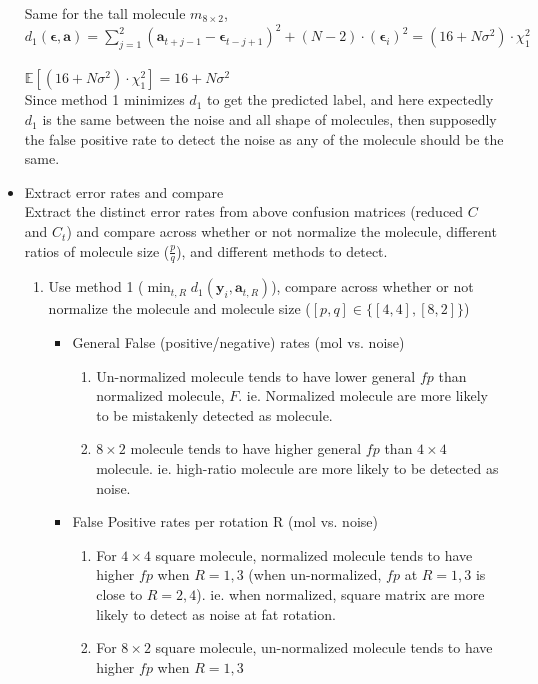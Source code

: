 \documentclass[11pt]{article}
\newcommand{\by}{\boldsymbol{y}}
\newcommand{\ba}{\boldsymbol{a}}
\begin{document}
\begin{itemize}
        Same for the tall molecule $m_{8 \times 2}$,\\
        $d_{1}(\mathbf{\epsilon}, \ba) = \sum_{j=1}^2 {(\ba_{t+j-1} - \mathbf{\epsilon}_{t-j+1})}^2 + (N-2)\cdot {(\mathbf{\epsilon}_i)}^2 = (16 + N\sigma^2) \cdot \chi_1^2$\\\\
        $\mathbb{E} [(16 + N\sigma^2) \cdot \chi_1^2] = 16 + N\sigma^2$\\
        
        Since method 1 minimizes $d_{1}$ to get the predicted label, and here expectedly $d_{1}$ is the same between the noise and all shape of molecules, then supposedly the false positive rate to detect the noise as any of the molecule should be the same.
    
        \item Extract error rates and compare\\
        Extract the distinct error rates from above confusion matrices (reduced $C$ and $C_t$) and compare across whether or not normalize the molecule, different ratios of molecule size ($\frac{p}{q}$), and different methods to detect.
    \begin{enumerate}
        \item Use method 1 ($\min_{t,R} d_{1}(\by_i,\mathbf{a}_{t,R})$), compare across whether or not normalize the molecule and molecule size ($[p,q] \in \{[4,4], [8,2]\}$)
        
        \begin{itemize}
        
            \item General False (positive/negative) rates (mol vs. noise)
            \begin{enumerate}
                \item Un-normalized molecule tends to have lower general $fp$ than normalized molecule, $F$. ie. Normalized molecule are more likely to be mistakenly detected as molecule.
                \item $8\times 2$ molecule tends to have higher general $fp$ than $4\times 4$ molecule. ie. high-ratio molecule are more likely to be detected as noise.
            \end{enumerate}
        
            \item False Positive rates per rotation R (mol vs. noise)
            \begin{enumerate}
                \item For $4\times 4$ square molecule, normalized molecule tends to have higher $fp$ when $R=1,3$ (when un-normalized, $fp$ at $R=1,3$ is close to $R=2,4$). ie. when normalized, square matrix are more likely to detect as noise at fat rotation.
                \item For $8\times 2$ square molecule, un-normalized molecule tends to have higher $fp$ when $R=1,3$
            \end{enumerate}
            

\end{itemize}
\end{enumerate}
\end{itemize}
\end{document}
